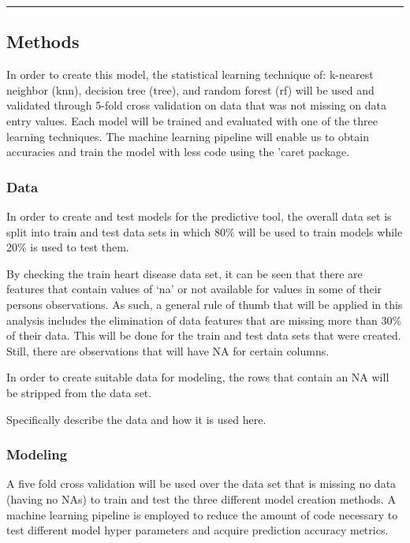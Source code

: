 \documentclass[
]{article}
\begin{document}
\begin{center}\rule{0.5\linewidth}{0.5pt}\end{center}

\hypertarget{methods}{%
\subsection{Methods}\label{methods}}

In order to create this model, the statistical learning technique of:
k-nearest neighbor (knn), decision tree (tree), and random forest (rf)
will be used and validated through 5-fold cross validation on data that
was not missing on data entry values. Each model will be trained and
evaluated with one of the three learning techniques. The machine
learning pipeline will enable us to obtain accuracies and train the
model with less code using the 'caret package.

\hypertarget{data}{%
\subsubsection{Data}\label{data}}

In order to create and test models for the predictive tool, the overall
data set is split into train and test data sets in which 80\% will be
used to train models while 20\% is used to test them.

By checking the train heart disease data set, it can be seen that there
are features that contain values of `na' or not available for values in
some of their persons observations. As such, a general rule of thumb
that will be applied in this analysis includes the elimination of data
features that are missing more than 30\% of their data. This will be
done for the train and test data sets that were created. Still, there
are observations that will have NA for certain columns.

In order to create suitable data for modeling, the rows that contain an
NA will be stripped from the data set.

Specifically describe the data and how it is used here.

\hypertarget{modeling}{%
\subsubsection{Modeling}\label{modeling}}

A five fold cross validation will be used over the data set that is
missing no data (having no NAs) to train and test the three different
model creation methods. A machine learning pipeline is employed to
reduce the amount of code necessary to test different model hyper
parameters and acquire prediction accuracy metrics.
\end{document}
